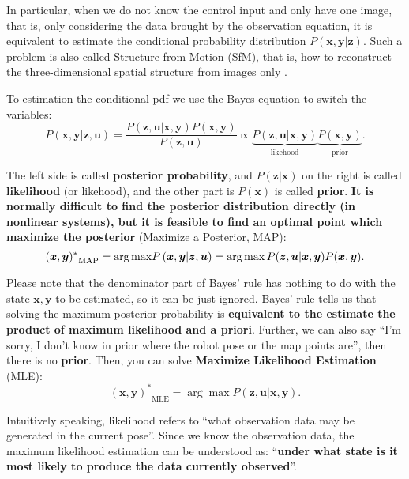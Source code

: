 In particular, when we do not know the control input and only have one image, that is, only considering the data brought by the observation equation, it is equivalent to estimate  the conditional probability distribution $ P (\bm {x}, \bm {y} | \bm { z}) $. Such a problem is also called Structure from Motion (SfM), that is, how to reconstruct the three-dimensional spatial structure from images only \textsuperscript {\cite {Agarwal2009}}.

To estimation the conditional pdf we use the Bayes equation to switch the variables:
\begin{equation}
P\left( { \bm{x},\bm{y}| \bm{z}, \bm{u}} \right) = \frac{{P\left( {\bm{z},\bm{u}|\bm{x},\bm{y}} \right)P\left( \bm{x}, \bm{y} \right)}}{{P\left( \bm{z},\bm{u}\right)}} \propto \underbrace{P\left(  { \bm{z},\bm{u}| \bm{x},\bm{y} } \right)}_{\text{likehood}} \underbrace{P\left( \bm{x},\bm{y} \right)}_{\text{prior}}.
\end{equation}

The left side is called \textbf {posterior probability}, and $ P (\bm {z} | \bm {x}) $ on the right is called \textbf {likelihood} (or likehood), and the other part is $ P (\bm {x}) $ is called \textbf {prior}. \textbf {It is normally difficult to find the posterior distribution directly (in nonlinear systems), but it is feasible to find an optimal point which maximize the posterior} (Maximize a Posterior, MAP):
\begin{equation}
{(\bm{x},\bm{y})^*}_{\mathrm{MAP}} = \arg {\mathop{\rm max}\nolimits} P \left( {\bm{x},\bm{y}|\bm{z},\bm{u}} \right) = \arg \max P(\bm{z},\bm{u}|\bm{x},\bm{y})P(\bm{x},\bm{y}).
\end{equation}

Please note that the denominator part of Bayes' rule has nothing to do with the state $ \bm {x}, \bm {y} $ to be estimated, so it can be just ignored. Bayes' rule tells us that solving the maximum posterior probability is \textbf {equivalent to the estimate the product of maximum likelihood and a priori}. Further, we can also say ``I'm sorry, I don't know in prior where the robot pose or the map points are'', then there is no \textbf {prior}. Then, you can solve \textbf {Maximize Likelihood Estimation} (MLE):
\begin{equation}
{ (\bm{x},\bm{y})^*}_{\mathrm{MLE}} = \arg \max P( \bm{z},\bm{u}| \bm{x},\bm{y}).
\end{equation}

Intuitively speaking, likelihood refers to ``what observation data may be generated in the current pose''. Since we know the observation data, the maximum likelihood estimation can be understood as: ``\textbf{under what state is it most likely to produce the data currently observed}''. 

